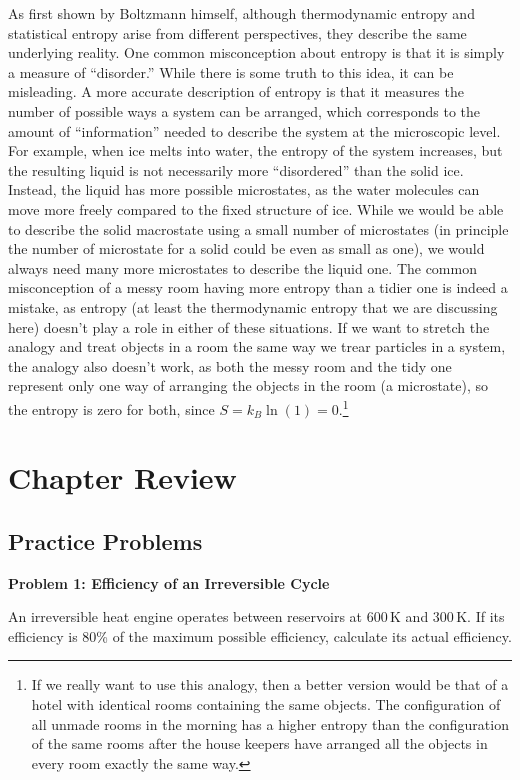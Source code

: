\documentclass[
  9pt,
]{extbook}
\theoremstyle{definition}
\theoremstyle{definition}
\theoremstyle{definition}
\theoremstyle{definition}
\theoremstyle{remark}
\begin{document}
As first shown by Boltzmann himself, although thermodynamic entropy and statistical entropy arise from different perspectives, they describe the same underlying reality. One common misconception about entropy is that it is simply a measure of ``disorder.'' While there is some truth to this idea, it can be misleading. A more accurate description of entropy is that it measures the number of possible ways a system can be arranged, which corresponds to the amount of ``information'' needed to describe the system at the microscopic level. For example, when ice melts into water, the entropy of the system increases, but the resulting liquid is not necessarily more ``disordered'' than the solid ice. Instead, the liquid has more possible microstates, as the water molecules can move more freely compared to the fixed structure of ice. While we would be able to describe the solid macrostate using a small number of microstates (in principle the number of microstate for a solid could be even as small as one), we would always need many more microstates to describe the liquid one. The common misconception of a messy room having more entropy than a tidier one is indeed a mistake, as entropy (at least the thermodynamic entropy that we are discussing here) doesn't play a role in either of these situations. If we want to stretch the analogy and treat objects in a room the same way we trear particles in a system, the analogy also doesn't work, as both the messy room and the tidy one represent only one way of arranging the objects in the room (a microstate), so the entropy is zero for both, since \(S=k_B \ln(1)=0\).\footnote{If we really want to use this analogy, then a better version would be that of a hotel with identical rooms containing the same objects. The configuration of all unmade rooms in the morning has a higher entropy than the configuration of the same rooms after the house keepers have arranged all the objects in every room exactly the same way.}

\section{Chapter Review}\label{rev6}

\subsection{Practice Problems}\label{exer6}

\textbf{Problem 1: Efficiency of an Irreversible Cycle}

An irreversible heat engine operates between reservoirs at \(600\,\text{K}\) and \(300\,\text{K}\). If its efficiency is 80\% of the maximum possible efficiency, calculate its actual efficiency.
\end{document}
